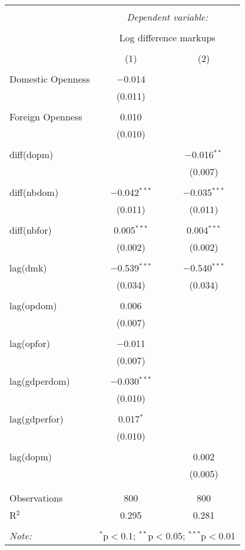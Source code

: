 
\begin{tabular}{@{\extracolsep{5pt}}lcc} 
\\[-1.8ex]\hline 
\hline \\[-1.8ex] 
 & \multicolumn{2}{c}{\textit{Dependent variable:}} \\ 
\cline{2-3} 
\\[-1.8ex] & \multicolumn{2}{c}{Log difference markups} \\ 
\\[-1.8ex] & (1) & (2)\\ 
\hline \\[-1.8ex] 
 Domestic Openness & $-$0.014 &  \\ 
  & (0.011) &  \\ 
  & & \\ 
 Foreign Openness & 0.010 &  \\ 
  & (0.010) &  \\ 
  & & \\ 
 diff(dopm) &  & $-$0.016$^{**}$ \\ 
  &  & (0.007) \\ 
  & & \\ 
 diff(nbdom) & $-$0.042$^{***}$ & $-$0.035$^{***}$ \\ 
  & (0.011) & (0.011) \\ 
  & & \\ 
 diff(nbfor) & 0.005$^{***}$ & 0.004$^{***}$ \\ 
  & (0.002) & (0.002) \\ 
  & & \\ 
 lag(dmk) & $-$0.539$^{***}$ & $-$0.540$^{***}$ \\ 
  & (0.034) & (0.034) \\ 
  & & \\ 
 lag(opdom) & 0.006 &  \\ 
  & (0.007) &  \\ 
  & & \\ 
 lag(opfor) & $-$0.011 &  \\ 
  & (0.007) &  \\ 
  & & \\ 
 lag(gdperdom) & $-$0.030$^{***}$ &  \\ 
  & (0.010) &  \\ 
  & & \\ 
 lag(gdperfor) & 0.017$^{*}$ &  \\ 
  & (0.010) &  \\ 
  & & \\ 
 lag(dopm) &  & 0.002 \\ 
  &  & (0.005) \\ 
  & & \\ 
\hline \\[-1.8ex] 
Observations & 800 & 800 \\ 
R$^{2}$ & 0.295 & 0.281 \\ 
\hline 
\hline \\[-1.8ex] 
\textit{Note:}  & \multicolumn{2}{r}{$^{*}$p$<$0.1; $^{**}$p$<$0.05; $^{***}$p$<$0.01} \\ 
\end{tabular} 
